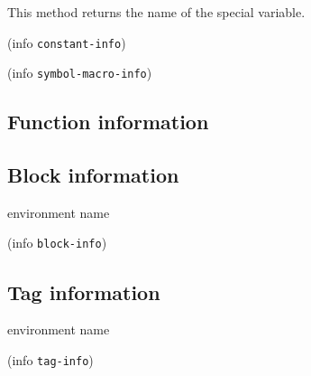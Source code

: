 This method returns the name of the special variable.


 {(info {\tt constant-info})}


 {(info {\tt symbol-macro-info})}

\subsection{Function information}

\subsection{Block information}

 {environment name}


 {(info {\tt block-info})}

\subsection{Tag information}

 {environment name}


 {(info {\tt tag-info})}

